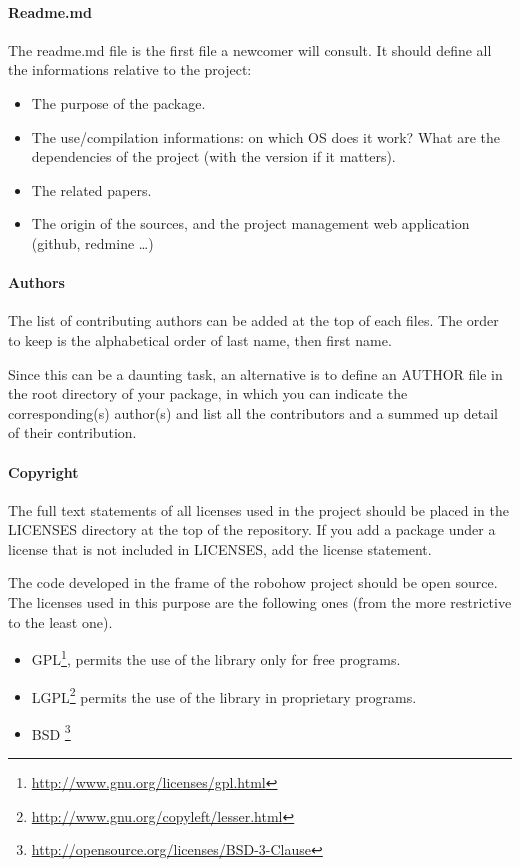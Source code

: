 \paragraph{Readme.md}
The readme.md file is the first file a newcomer will consult. 
It should define all the informations relative to the project:
\begin{itemize}[noitemsep,topsep=0pt,parsep=0pt,partopsep=0pt]
\item The purpose of the package.
\item The use/compilation informations: on which OS does it work? What are the dependencies of the project (with the version if it matters).
\item The related papers.
\item The origin of the sources, and the project management web application (github, redmine \ldots) 
\end{itemize}

\paragraph{Authors}
The list of contributing authors can be added at the top of each files.
The order to keep is the alphabetical order of last name, then first name.

Since this can be a daunting task, an alternative is to define an AUTHOR file in the root directory of your package, in which you can indicate the corresponding(s) author(s) and list all the contributors and a summed up detail of their contribution.\\

\paragraph{Copyright}
The full text statements of all licenses used in the project should be placed in the LICENSES directory at the top of the repository.
If you add a package under a license that is not included in LICENSES, add the license statement.

The code developed in the frame of the robohow project should be open source.
The licenses used in this purpose are the following ones (from the more restrictive to the least one).
\begin{itemize}
\item GPL\footnote{\url{http://www.gnu.org/licenses/gpl.html}}, permits the use of the library only for free programs.
\item LGPL\footnote{\url{http://www.gnu.org/copyleft/lesser.html}} permits the use of the library in proprietary programs.
\item BSD \footnote{\url{http://opensource.org/licenses/BSD-3-Clause}}
\end{itemize}

